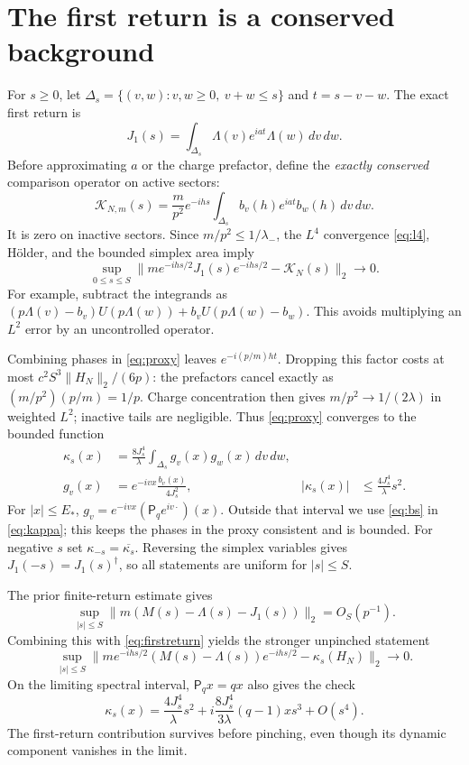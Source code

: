 \documentclass[11pt,a4paper]{article}
\newcommand{\Mq}{\mathsf P_q}
\begin{document}
\newpage
\section{The first return is a conserved background}
For $s\ge0$, let $\Delta_s=\{(v,w):v,w\ge0,\ v+w\le s\}$ and
$t=s-v-w$. The exact first return is
\begin{equation}
 J_1(s)=\int_{\Delta_s}\Lambda(v)e^{iat}\Lambda(w)\,dv\,dw.
\end{equation}
Before approximating $a$ or the charge prefactor, define the
\emph{exactly conserved} comparison operator on active sectors:
\begin{equation}
 \mathcal K_{N,m}(s)=\frac{m}{p^2}e^{-ihs}
 \int_{\Delta_s} b_v(h)e^{iat}b_w(h)\,dv\,dw.
 \label{eq:proxy}
\end{equation}
It is zero on inactive sectors. Since $m/p^2\le1/\lambda_-$,
the $L^4$ convergence \eqref{eq:l4}, H\"older, and the bounded
simplex area imply
\begin{equation}
 \sup_{0\le s\le S}
 \|m e^{-ihs/2}J_1(s)e^{-ihs/2}-\mathcal K_N(s)\|_2\to0.
 \label{eq:firstreturn}
\end{equation}
For example, subtract the integrands as
$(p\Lambda(v)-b_v)U(p\Lambda(w))+b_vU(p\Lambda(w)-b_w)$.
This avoids multiplying an $L^2$ error by an uncontrolled operator.

Combining phases in \eqref{eq:proxy} leaves
$e^{-i(p/m)ht}$. Dropping this factor costs at most
$c^2 S^3\|H_N\|_2/(6p)$: the prefactors cancel exactly as
$(m/p^2)(p/m)=1/p$. Charge concentration then gives
$m/p^2\to1/(2\lambda)$ in weighted $L^2$; inactive tails are
negligible. Thus \eqref{eq:proxy} converges to the bounded function
\begin{align}
 \kappa_s(x)&=\frac{8J_s^4}{\lambda}
 \int_{\Delta_s}g_v(x)g_w(x)\,dv\,dw,\label{eq:kappa}\\
 g_v(x)&=e^{-ivx}\frac{b_v(x)}{4J_s^2},&
 |\kappa_s(x)|&\le\frac{4J_s^4}{\lambda}s^2.
\end{align}
For $|x|\le E_*$, $g_v=e^{-ivx}(\Mq e^{iv\cdot})(x)$.
Outside that interval we use \eqref{eq:bs} in \eqref{eq:kappa};
this keeps the phases in the proxy consistent and is bounded.
For negative $s$ set $\kappa_{-s}=\overline{\kappa_s}$.
Reversing the simplex variables gives $J_1(-s)=J_1(s)^\dagger$,
so all statements are uniform for $|s|\le S$.

The prior finite-return estimate gives
\begin{equation}
 \sup_{|s|\le S}\|m(M(s)-\Lambda(s)-J_1(s))\|_2=O_S(p^{-1}).
\end{equation}
Combining this with \eqref{eq:firstreturn} yields the stronger
unpinched statement
\begin{equation}
 \sup_{|s|\le S}
 \|m e^{-ihs/2}(M(s)-\Lambda(s))e^{-ihs/2}
       -\kappa_s(H_N)\|_2\longrightarrow0.\label{eq:background}
\end{equation}
On the limiting spectral interval, $\Mq x=qx$ also gives the check
\begin{equation}
 \kappa_s(x)=\frac{4J_s^4}{\lambda}s^2
 +i\frac{8J_s^4}{3\lambda}(q-1)x s^3+O(s^4).
\end{equation}
The first-return contribution survives before pinching, even though
its dynamic component vanishes in the limit.
\end{document}
